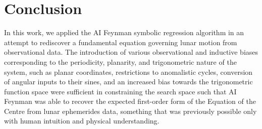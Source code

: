 \documentclass[fleqn,10pt]{olplainarticle}
\numberwithin{equation}{subsection}
\begin{document}

    
\section{Conclusion}


In this work, we applied the AI Feynman symbolic regression algorithm in an attempt to rediscover a fundamental equation governing lunar motion from observational data. The introduction of various observational and inductive biases corresponding to the periodicity, planarity, and trigonometric nature of the system, such as planar coordinates, restrictions to anomalistic cycles, conversion of angular inputs to their sines, and an increased bias towards the trigonometric function space were sufficient in constraining the search space such that AI Feynman was able to recover the expected first-order form of the Equation of the Centre from lunar ephemerides data, something that was previously possible only with human intuition and physical understanding.
\end{document}
